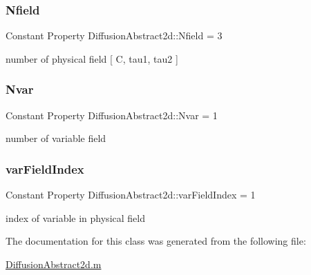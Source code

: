 \mbox{\label{class_diffusion_abstract2d_aa7e34b14d43e21039a339a832cc498b7}} 
\subsubsection{\texorpdfstring{Nfield}{Nfield}}
{\footnotesize\ttfamily Constant Property Diffusion\+Abstract2d\+::\+Nfield = 3}



number of physical field \mbox{[} C, tau1, tau2 \mbox{]} 

\mbox{\label{class_diffusion_abstract2d_a529cab38446e4f35dbfa06777f557fd9}} 
\subsubsection{\texorpdfstring{Nvar}{Nvar}}
{\footnotesize\ttfamily Constant Property Diffusion\+Abstract2d\+::\+Nvar = 1}



number of variable field 

\mbox{\label{class_diffusion_abstract2d_a54399b115ac6a84e82c38acc0c070cb0}} 
\subsubsection{\texorpdfstring{var\+Field\+Index}{varFieldIndex}}
{\footnotesize\ttfamily Constant Property Diffusion\+Abstract2d\+::var\+Field\+Index = 1}



index of variable in physical field 



The documentation for this class was generated from the following file\+:\begin{DoxyCompactItemize}
\item 
\hyperlink{_diffusion_abstract2d_8m}{Diffusion\+Abstract2d.\+m}\end{DoxyCompactItemize}
